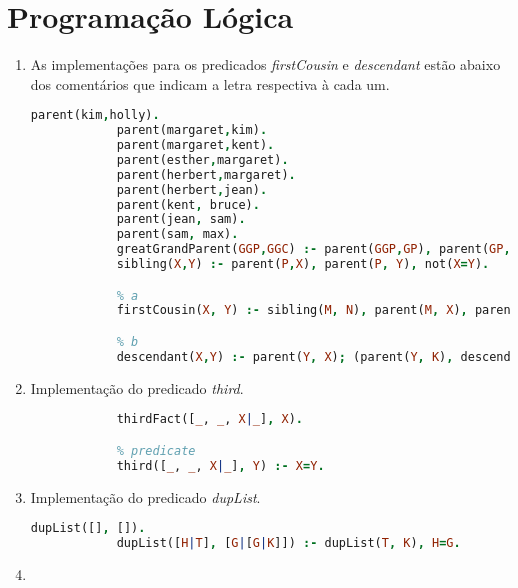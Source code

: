 \documentclass{article}
\begin{document}
\newpage

\section{Programação Lógica}

\begin{enumerate}
    \item

        As implementações para os predicados \textit{firstCousin} e \textit{descendant} estão abaixo dos comentários
        que indicam a letra respectiva à cada um.

        \begin{lstlisting}[language=Prolog]
            parent(kim,holly).
            parent(margaret,kim).
            parent(margaret,kent).
            parent(esther,margaret).
            parent(herbert,margaret).
            parent(herbert,jean).
            parent(kent, bruce).
            parent(jean, sam).
            parent(sam, max).
            greatGrandParent(GGP,GGC) :- parent(GGP,GP), parent(GP,P), parent(P,GGC).
            sibling(X,Y) :- parent(P,X), parent(P, Y), not(X=Y).

            % a
            firstCousin(X, Y) :- sibling(M, N), parent(M, X), parent(N, Y), not(X=Y), not(sibling(X, Y)).

            % b
            descendant(X,Y) :- parent(Y, X); (parent(Y, K), descendant(X, K)).
        \end{lstlisting}

    \item

        Implementação do predicado \textit{third}.

        \begin{lstlisting}[language=Prolog]
            % fact
            thirdFact([_, _, X|_], X).

            % predicate
            third([_, _, X|_], Y) :- X=Y.
        \end{lstlisting}

    \item

        Implementação do predicado \textit{dupList}.    

        \begin{lstlisting}[language=Prolog]
            dupList([], []).
            dupList([H|T], [G|[G|K]]) :- dupList(T, K), H=G.
        \end{lstlisting}

    \item


\end{enumerate}
\end{document}
